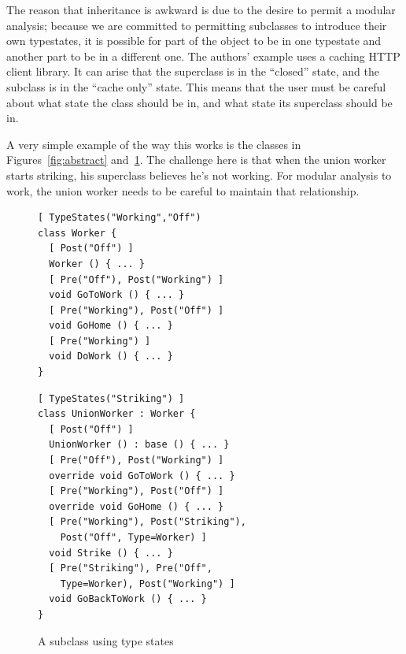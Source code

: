 \documentclass{article}
\begin{document}
\begin{multicols}{2}
The reason that inheritance is awkward is due to the desire to permit
a modular analysis; because we are committed to permitting subclasses
to introduce their own typestates, it is possible for part of the
object to be in one typestate and another part to be in a different
one.  The authors' example uses a caching HTTP client library.  It can
arise that the superclass is in the ``closed'' state, and the subclass
is in the ``cache only'' state.  This means that the user must be
careful about what state the class should be in, and what state its
superclass should be in.

A very simple example of the way this works is the classes in
Figures~\ref{fig:abstract} and~\ref{fig:concrete}.  The challenge here
is that when the union worker starts striking, his superclass believes
he's not working.  For modular analysis to work, the union worker
needs to be careful to maintain that relationship.

\begin{figure}
  \hfill
  \begin{minipage}[t]{.45\textwidth}
    \begin{center}
      \begin{small}
\begin{verbatim}
[ TypeStates("Working","Off")
class Worker {
  [ Post("Off") ]
  Worker () { ... }
  [ Pre("Off"), Post("Working") ]
  void GoToWork () { ... }
  [ Pre("Working"), Post("Off") ]
  void GoHome () { ... }
  [ Pre("Working") ]
  void DoWork () { ... }
}
\end{verbatim}
      \end{small}
      \caption{A base class using type states}
      \label{fig:abstract}
    \end{center}
  \end{minipage}
  \hfill
  \begin{minipage}[t]{.45\textwidth}
    \begin{center}
      \begin{small}
\begin{verbatim}
[ TypeStates("Striking") ]
class UnionWorker : Worker {
  [ Post("Off") ]
  UnionWorker () : base () { ... }
  [ Pre("Off"), Post("Working") ]
  override void GoToWork () { ... }
  [ Pre("Working"), Post("Off") ]
  override void GoHome () { ... }
  [ Pre("Working"), Post("Striking"),
    Post("Off", Type=Worker) ]
  void Strike () { ... }
  [ Pre("Striking"), Pre("Off", 
    Type=Worker), Post("Working") ]
  void GoBackToWork () { ... }
}
\end{verbatim}
        \caption{A subclass using type states}
        \label{fig:concrete}
      \end{small}
    \end{center}
  \end{minipage}
  \hfill
\end{figure}


\end{multicols}
\end{document}
